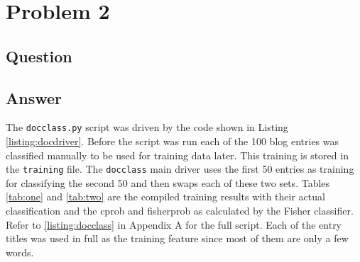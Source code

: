 \section{Problem 2}

\subsection{Question}


\subsection{Answer}

The {\tt docclass.py} script was driven by the code shown in Listing \ref{listing:docdriver}. Before the script was run each of the 100 blog entries was classified manually to be used for training data later. This training is stored in the {\tt training} file. The {\tt docclass} main driver uses the first 50 entries as training for classifying the second 50 and then swaps each of these two sets. Tables \ref{tab:one} and \ref{tab:two} are the compiled training results with their actual classification and the cprob and fisherprob as calculated by the Fisher classifier. Refer to \ref{listing:docclass} in Appendix A for the full script. Each of the entry titles was used in full as the training feature since most of them are only a few words.



\clearpage

